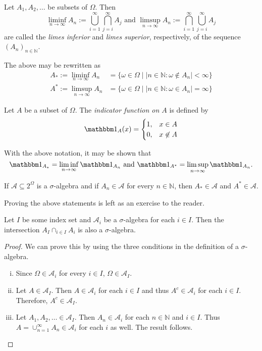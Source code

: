 \begin{definition}
\label{defLimes}
    Let $A_1,A_2,\ldots$ be subsets of $\Omega$. Then
    $$\liminf_{n\to\infty}A_n:=\bigcup_{i=1}^\infty\bigcap_{j=i}^\infty A_j\text{ and }\limsup_{n\to\infty}A_n:=\bigcap_{i=1}^\infty\bigcup_{j=i}^\infty A_j$$
    are called the \textit{limes inferior} and \textit{limes superior}, respectively, of the sequence $(A_n)_{n\in\mathbb{N}}$.
\end{definition}

The above may be rewritten as
\begin{align*}
    A_*:=\liminf_{n\to\infty}A_n &= \{\omega\in\Omega\mid |n\in\mathbb{N}:\omega\not\in A_n|<\infty\} \\
    A^*:=\limsup_{n\to\infty}A_n &= \{\omega\in\Omega\mid |n\in\mathbb{N}:\omega\in A_n|=\infty\}
\end{align*}

\begin{definition}
    Let $A$ be a subset of $\Omega$. The \textit{indicator function on $A$} is defined by
    $$\indic_A(x)
    =
    \begin{cases}
    1, & x\in A \\
    0, & x\not\in A
    \end{cases}
    $$
\end{definition}

With the above notation, it may be shown that
$$\indic_{A_*}=\liminf_{n\to\infty}\indic_{A_n}\text{ and }\indic_{A^*}=\limsup_{n\to\infty}\indic_{A_n}.$$

If $\mathcal{A}\subseteq2^\Omega$ is a $\sigma$-algebra and if $A_n\in\mathcal{A}$ for every $n\in\mathbb{N}$, then $A_*\in\mathcal{A}$ and $A^*\in\mathcal{A}$.

Proving the above statements is left as an exercise to the reader.

\begin{theorem}
\label{capofSigmaAisSigmaA}
    Let $I$ be some index set and $\mathcal{A}_i$ be a $\sigma$-algebra for each $i\in I$. Then the intersection $A_I\displaystyle\cap_{i\in I}A_i$ is also a $\sigma$-algebra.
\end{theorem}
\begin{proof}
    We can prove this by using the three conditions in the definition of a $\sigma$-algebra.
    \begin{enumerate}[(i)]
        \item Since $\Omega\in \mathcal{A}_i$ for every $i\in I$, $\Omega\in \mathcal{A}_I$.
        \item Let $A\in \mathcal{A}_I$. Then $A\in \mathcal{A}_i$ for each $i\in I$ and thus $A^c\in \mathcal{A}_i$ for each $i\in I$. Therefore, $A^c\in \mathcal{A}_I$.
        \item Let $A_1,A_2,\ldots\in \mathcal{A}_I$. Then $A_n\in\mathcal{A}_i$ for each $n\in\mathbb{N}$ and $i\in I$. Thus $A=\cup_{n=1}^\infty A_n\in\mathcal{A}_i$ for each $i$ as well. The result follows.
    \end{enumerate}
\end{proof}

